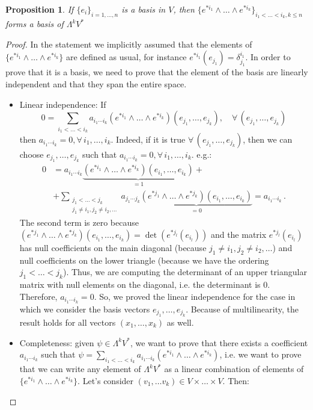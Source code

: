 \documentclass[a4paper,11pt,titlepage, article, oneside]{memoir}
\numberwithin{equation}{section}
\newtheorem{proposition}[theorem]{Proposition}
\theoremstyle{definition}
\theoremstyle{remark}
\begin{document}
\begin{proposition}\label{basisprop1}
  If $\{e_i\}_{i=1,\ldots,n}$ is a basis in $V$, then $\{e^{*i_1} \wedge \ldots \wedge e^{*i_k}\}_{i_1 < \ldots < i_k, k \le n}$ forms a basis of $\Lambda ^k V^*$
\end{proposition}
\begin{proof}[Proof]
In the statement we implicitly assumed that the elements of $\{e^{*i_1} \wedge \ldots \wedge e^{*i_k}\}$ are defined as usual, for instance $e^{*i_1}(e_{j_1}) = \delta^{i_1}_{j_1}$. In order to prove that it is a basis, we need to prove that the element of the basis are linearly independent and that they span the entire space.
\begin{itemize}
\item Linear independence: If 
$$0 = \sum\limits_{i_1 < \ldots < i_k} a_{i_1 \cdots i_k} (e^{*i_1} \wedge \ldots \wedge e^{*i_k})(e_{j_1}, \ldots, e_{j_k}), \quad \forall \, (e_{j_1}, \ldots, e_{j_k})$$
then $a_{i_1 \cdots i_k} = 0, \forall\, i_1, \ldots, i_k$. Indeed, if it is true $\forall \, (e_{j_1}, \ldots, e_{j_k})$, then we can choose $e_{j_1}, \ldots, e_{j_k}$ such that $a_{i_1 \cdots i_k} = 0, \forall\, i_1, \ldots, i_k$. e.g.:
\begin{align*}
0 &= a_{i_1 \cdots i_k} \underbrace{(e^{*i_1} \wedge \ldots \wedge e^{*i_k}) (e_{i_1}, \ldots, e_{i_k})}_{= 1} + \\
& + \sum\limits_{\substack{j_1 < \ldots < j_k \\
j_1 \not = i_1, j_2 \not = i_2, \ldots}} a_{j_1 \cdots j_k} \underbrace{(e^{*j_1} \wedge \ldots \wedge e^{*j_k}) (e_{i_1}, \ldots, e_{i_k})}_{= 0} = a_{i_1 \cdots i_k} \, .
\end{align*}
The second term is zero because $(e^{*j_1} \wedge \ldots \wedge e^{*j_k}) (e_{i_1}, \ldots, e_{i_k}) = \det \left (e^{*j_l} (e_{i_l}) \right)$ and the matrix $e^{*j_l} (e_{i_l})$ has null coefficients on the main diagonal (because $j_1 \not = i_1, j_2 \not = i_2, \ldots$) and null coefficients on the lower triangle (because we have the ordering $j_1 < \ldots < j_k$). Thus, we are computing the determinant of an upper triangular matrix with null elements on the diagonal, i.e. the determinant is 0.
Therefore, $a_{i_1 \cdots i_k} = 0$.
So, we proved the linear independence for the case in which we consider the basis vectors $e_{j_1}, \ldots, e_{j_k}$. Because of multilinearity, the result holds for all vectors
 $(x_1, \ldots, x_k)$ as well.
\item Completeness: given $\psi \in \Lambda^k V^*$, we want to prove that there exists a coefficient $a_{i_1 \cdots i_k}$ such that $\psi = \sum\limits_{i_1 < \ldots < i_k} a_{i_1 \cdots i_k} (e^{*i_1} \wedge \ldots \wedge e^{*i_k})$, i.e. we want to prove that we can write any element of $\Lambda^k V^*$ as a linear combination of elements of $\{e^{*i_1} \wedge \ldots \wedge e^{*i_k}\}$. Let's consider $(v_1, \ldots v_k) \in V \times \ldots \times V$. Then:

\end{itemize}
\end{proof}
\end{document}
